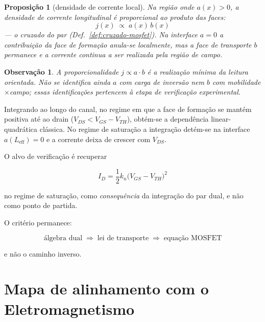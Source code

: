 \documentclass[11pt,a4paper]{article}
\newtheorem{proposicao}[teorema]{Proposição}
\newtheorem{observacao}[teorema]{Observação}
\begin{document}
\begin{proposicao}[densidade de corrente local]
\label{prop:densidade}
Na região onde \(a(x)>0\), a densidade de corrente longitudinal
é proporcional ao produto das faces:
\[
\boxed{\;j(x)\;\propto\;a(x)\,b(x)\;}
\]
--- o cruzado do par (Def.~\ref{def:cruzado-mosfet}). Na interface
\(a=0\) a contribuição da face de formação anula-se localmente,
mas a face de transporte \(b\) permanece e a corrente continua
a ser realizada pela região de campo.
\end{proposicao}

\begin{observacao}
A proporcionalidade \(j\propto a\cdot b\) é a realização mínima
da leitura orientada. Não se identifica ainda \(a\) com carga de
inversão nem \(b\) com mobilidade\(\times\)campo; essas
identificações pertencem à etapa de verificação experimental.
\end{observacao}

Integrando ao longo do canal, no regime em que a face de formação
se mantém positiva até ao drain (\(V_{DS}<V_{GS}-V_{TH}\)),
obtém-se a dependência linear-quadrática clássica. No regime de
saturação a integração detém-se na interface \(a(L_{\mathrm{eff}})=0\)
e a corrente deixa de crescer com \(V_{DS}\).

O alvo de verificação é recuperar

\[
I_D
=
\frac12 k_n
\bigl(V_{GS}-V_{TH}\bigr)^2
\]

no regime de saturação, como \emph{consequência} da integração do
par dual, e não como ponto de partida.

O critério permanece:

\[
\boxed{
\text{álgebra dual}
\;\Longrightarrow\;
\text{lei de transporte}
\;\Longrightarrow\;
\text{equação MOSFET}
}
\]

e não o caminho inverso.


\section{Mapa de alinhamento com o Eletromagnetismo}
\label{sec:mapa}
\end{document}
